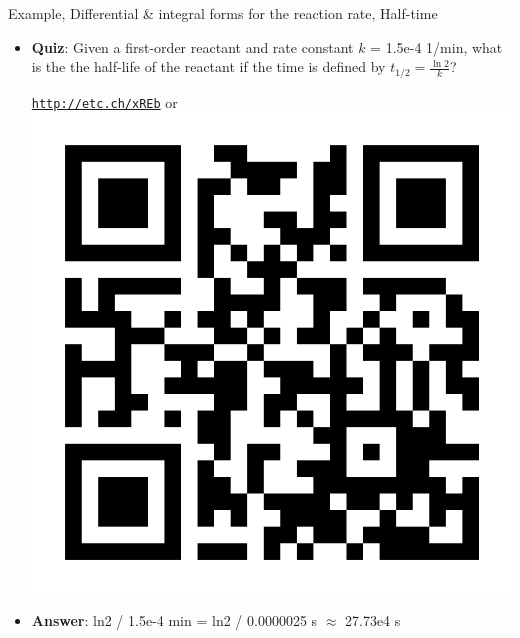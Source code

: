 %
\begin{frame}[<+->]{Example, Differential \& integral forms for the reaction rate, Half-time}
	\begin{itemize}
		\item \alert{\bf Quiz}: Given a first-order reactant and rate constant  $k$ = 1.5e-4 1/min, what is the the half-life of the reactant if the time is defined by  $t_{1/2} = \tfrac{\ln 2}{k}$?
		\begin{center}
			\href{http://etc.ch/xREb}{\textcolor{indigo(dye)}{\tt http://etc.ch/xREb}} or 
			\includegraphics[height=0.2\columnwidth]{figures/chemical-kinetics/polls.png}
		\end{center}
		\hiddenpause 
		\vskip 10pt
		\item {\bf Answer}: ln2 / 1.5e-4 min = 
		ln2 / 0.0000025 s $\approx$ 27.73e4 s
	\end{itemize}
\end{frame}
%
%
